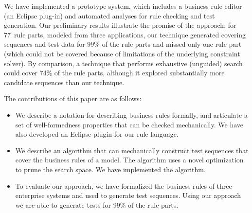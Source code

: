 We have implemented a prototype system, which includes a business rule editor
(an Eclipse plug-in) and automated analyses for rule checking and test
generation. Our preliminary results illustrate the promise of the approach: for
77~rule parts, modeled from three applications, our technique generated covering
sequences and test data for 99\% of the rule parts and missed only one rule part
(which could not be covered because of limitations of the underlying constraint
solver). By comparison, a technique that performs exhaustive (unguided) search
could cover 74\% of the rule parts, although it explored substantially more
candidate sequences than our technique.

The contributions of this paper are as follows:
\begin{itemize}[noitemsep]
\item We describe a notation for describing business rules formally, and articulate
  a set of well-formedness properties that can be checked mechanically. We have 
  also developed an Eclipse plugin for our rule language.
\item We describe an algorithm that can mechanically construct test sequences
  that cover the business rules of a model. The algorithm uses a
  novel optimization to prune the search space. We have implemented
  the algorithm. %
\item To evaluate our approach, we have formalized the business rules
  of three enterprise systems and used \tool{} to generate test
  sequences. Using our approach we are able to generate tests for 99\%
  of the rule parts.
\end{itemize}


